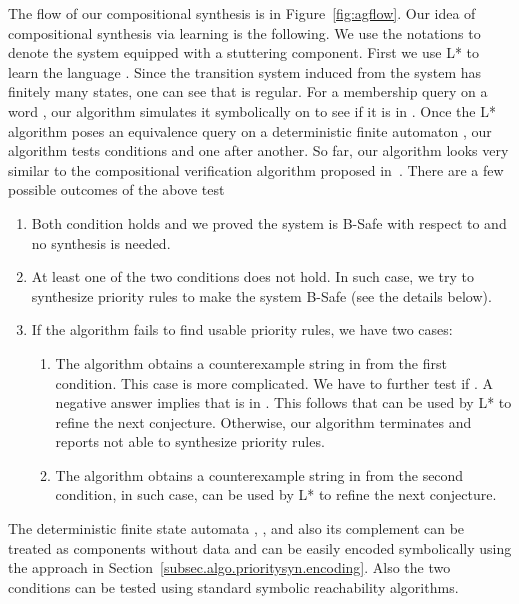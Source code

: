 \documentclass[10pt, a4paper, onecolumn, conference, compsocconf]{IEEEtran}
\begin{document}
The flow of our compositional synthesis is in Figure~\ref{fig:agflow}. Our idea of compositional synthesis via learning is the following. We use the notations  to denote the system  equipped with a stuttering component.
First we use L* to learn the language . Since the transition system induced from the system  has finitely many states, one can see that  is regular. For a membership query on a word , our algorithm simulates it symbolically on  to see if it is in . Once the L* algorithm poses an equivalence query on a deterministic finite automaton , our algorithm tests conditions  and  one after another.
So far, our algorithm looks very similar to the compositional verification algorithm proposed in~\cite{cobleigh2003learning}.
There are a few possible outcomes of the above test
 \begin{enumerate}
   \item Both condition holds and we proved the system is B-Safe with respect to  and no synthesis is needed.
   \item At least one of the two conditions does not hold. In such case, we try to synthesize priority rules to make the system B-Safe (see the details below).
   \item If the algorithm fails to find usable priority rules, we have two cases:
   \begin{enumerate}
     \item The algorithm obtains a counterexample string  in  from the first condition. This case is more complicated. We have to further test if . A negative answer implies that  is in . This follows that  can be used by L* to refine the next conjecture. Otherwise, our algorithm terminates and reports not able to synthesize priority rules.
     \item The algorithm obtains a counterexample string  in  from the second condition, in such case,  can be used by L* to refine the next conjecture.
   \end{enumerate}
 \end{enumerate}

The deterministic finite state automata , , and also its complement  can be treated as components without data and can be easily encoded symbolically using the approach in Section~\ref{subsec.algo.prioritysyn.encoding}. Also the two conditions can be tested using standard symbolic reachability algorithms.
\end{document}

